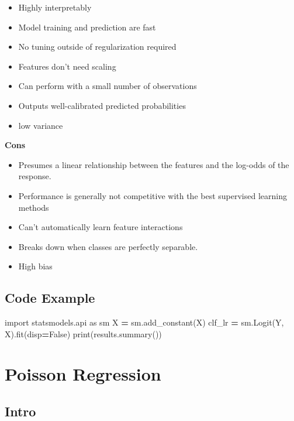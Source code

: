 \documentclass[]{book}
\newenvironment{Shaded}{\begin{snugshade}}{\end{snugshade}}
\newcommand{\ImportTok}[1]{#1}
\newcommand{\VariableTok}[1]{\textcolor[rgb]{0.00,0.00,0.00}{#1}}
\newcommand{\OperatorTok}[1]{\textcolor[rgb]{0.81,0.36,0.00}{\textbf{#1}}}
\newcommand{\BuiltInTok}[1]{#1}
\newcommand{\NormalTok}[1]{#1}
\theoremstyle{definition}
\theoremstyle{definition}
\theoremstyle{definition}
\theoremstyle{remark}
\begin{document}
\begin{itemize}
\item
  Highly interpretably
\item
  Model training and prediction are fast
\item
  No tuning outside of regularization required
\item
  Features don't need scaling
\item
  Can perform with a small number of observations
\item
  Outputs well-calibrated predicted probabilities
\item
  low variance
\end{itemize}

\textbf{Cons}

\begin{itemize}
\item
  Presumes a linear relationship between the features and the log-odds
  of the response.
\item
  Performance is generally not competitive with the best supervised
  learning methods
\item
  Can't automatically learn feature interactions
\item
  Breaks down when classes are perfectly separable.
\item
  High bias
\end{itemize}

\subsection{Code Example}\label{code-example}

\begin{Shaded}
\begin{Highlighting}[]
\ImportTok{import}\NormalTok{ statsmodels.api }\ImportTok{as}\NormalTok{ sm}
\NormalTok{X }\OperatorTok{=}\NormalTok{ sm.add_constant(X)}
\NormalTok{clf_lr }\OperatorTok{=}\NormalTok{ sm.Logit(Y, X).fit(disp}\OperatorTok{=}\VariableTok{False}\NormalTok{)}
\BuiltInTok{print}\NormalTok{(results.summary())}
\end{Highlighting}
\end{Shaded}

\section{Poisson Regression}\label{poisson-regression}

\subsection{Intro}\label{intro-9}
\end{document}
